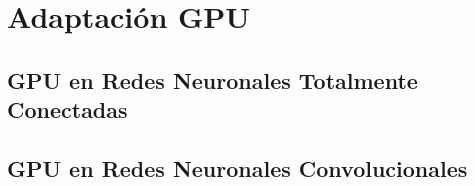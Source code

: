 \chapter{Adaptación GPU}

\section{GPU en Redes Neuronales Totalmente Conectadas}
\section{GPU en Redes Neuronales Convolucionales}